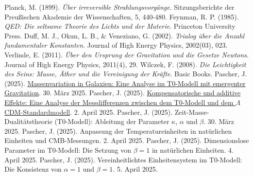\documentclass{article}
\begin{document}
	\begin{thebibliography}{10}
		 Planck, M. (1899). \textit{Über irreversible Strahlungsvorgänge}. Sitzungsberichte der Preußischen Akademie der Wissenschaften, 5, 440-480.
		 Feynman, R. P. (1985). \textit{QED: Die seltsame Theorie des Lichts und der Materie}. Princeton University Press.
		 Duff, M. J., Okun, L. B., \& Veneziano, G. (2002). \textit{Trialog über die Anzahl fundamentaler Konstanten}. Journal of High Energy Physics, 2002(03), 023.
		 Verlinde, E. (2011). \textit{Über den Ursprung der Gravitation und die Gesetze Newtons}. Journal of High Energy Physics, 2011(4), 29.
		 Wilczek, F. (2008). \textit{Die Leichtigkeit des Seins: Masse, Äther und die Vereinigung der Kräfte}. Basic Books.
		 Pascher, J. (2025). \href{https://github.com/jpascher/T0-Time-Mass-Duality/tree/main/2/pdf/Deutsch/Massenvariation in Galaxien - Eine Analyse im T0-Modell mit emergenter Gravitation.pdf}{Massenvariation in Galaxien: Eine Analyse im T0-Modell mit emergenter Gravitation}. 30. März 2025.
		 Pascher, J. (2025). \href{https://github.com/jpascher/T0-Time-Mass-Duality/tree/main/2/pdf/Deutsch/Analyse der Messdifferenzen zwischen dem T0-Modell und dem Standardmodell.pdf}{Kompensatorische und additive Effekte: Eine Analyse der Messdifferenzen zwischen dem T0-Modell und dem \(\Lambda\)CDM-Standardmodell}. 2. April 2025.
		 Pascher, J. (2025). Zeit-Masse-Dualitätstheorie (T0-Modell): Ableitung der Parameter \(\kappa\), \(\alpha\) und \(\beta\). 30. März 2025.
		 Pascher, J. (2025). Anpassung der Temperatureinheiten in natürlichen Einheiten und CMB-Messungen. 2. April 2025.
		 Pascher, J. (2025). Dimensionslose Parameter im T0-Modell: Die Setzung von \(\beta = 1\) in natürlichen Einheiten. 4. April 2025.
		 Pascher, J. (2025). Vereinheitlichtes Einheitensystem im T0-Modell: Die Konsistenz von \(\alpha = 1\) und \(\beta = 1\). 5. April 2025.
	\end{thebibliography}
	
\end{document}
